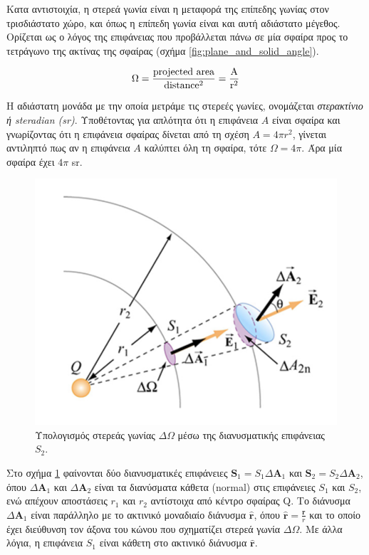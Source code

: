 Κατα αντιστοιχία, η στερεά γωνία είναι η μεταφορά της επίπεδης γωνίας στον τρισδιάστατο χώρο, και όπως η επίπεδη γωνία είναι και αυτή αδιάστατο μέγεθος. Ορίζεται ως ο λόγος της επιφάνειας που προβάλλεται πάνω σε μία σφαίρα προς το τετράγωνο της ακτίνας της σφαίρας (σχήμα \ref{fig:plane_and_solid_angle}).

\begin{equation}
    \label{eq:solid_angle}
    \Omega = \rm \frac{projected \ area}{distance ^2}=\frac{A}{r^2}
\end{equation}

Η αδιάστατη μονάδα με την οποία μετράμε τις στερεές γωνίες, ονομάζεται \textit{στερακτίνιο ή steradian (sr)}. Υποθέτοντας για απλότητα ότι η επιφάνεια $A$ είναι σφαίρα και γνωρίζοντας ότι η επιφάνεια σφαίρας δίνεται από τη σχέση $A = 4\pi r^2$, γίνεται αντιληπτό πως αν η επιφάνεια $A$ καλύπτει όλη τη σφαίρα, τότε $\Omega = 4 \pi$. Άρα μία σφαίρα έχει $4 \pi$ sr.\\


\begin{figure}[h]
    \centering
    \includegraphics[scale=0.6]{Figures/solid_angle_projection.png}
    \caption{Υπολογισμός στερεάς γωνίας $\Delta \Omega$ μέσω της διανυσματικής επιφάνειας $S_2$.}
    \label{fig:solid_angle_projection}
\end{figure}

Στο σχήμα \ref{fig:solid_angle_projection} φαίνονται δύο διανυσματικές επιφάνειες $\boldsymbol{S}_1 = S_1 \Delta \boldsymbol{A}_1$ και $\boldsymbol{S}_2 = S_2 \Delta \boldsymbol{A}_2$, όπου $\Delta \boldsymbol{A}_1$ και $\Delta \boldsymbol{A}_2$ είναι τα διανύσματα κάθετα (normal) στις επιφάνειες $S_1$ και $S_2$, ενώ απέχουν αποστάσεις $r_1$ και $r_2$ αντίστοιχα από κέντρο σφαίρας Q.
Το διάνυσμα $\Delta \boldsymbol{A}_1$ είναι παράλληλο με το ακτινικό μοναδιαίο διάνυσμα $\boldsymbol{\hat{r}}$, όπου $\boldsymbol{\hat{r}} = \frac{\boldsymbol{r}}{r}$ και το οποίο έχει διεύθυνση τον άξονα του κώνου που σχηματίζει στερεά γωνία $\Delta \Omega$. Με άλλα λόγια, η επιφάνεια $S_1$ είναι κάθετη στο ακτινικό διάνυσμα $\boldsymbol{\hat{r}}$.

